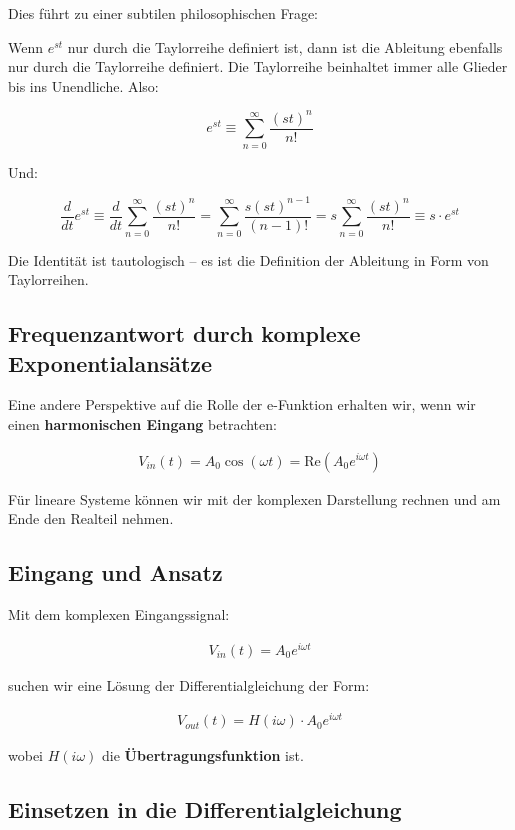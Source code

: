 \documentclass[a4paper, 12pt, twoside, openright]{report}
\theoremstyle{definition}
\theoremstyle{definition}
\begin{document}
Dies führt zu einer subtilen philosophischen Frage: 

Wenn $e^{st}$ nur durch die Taylorreihe definiert ist, dann ist die Ableitung ebenfalls nur durch die Taylorreihe definiert. Die Taylorreihe beinhaltet immer alle Glieder bis ins Unendliche. Also:

$$e^{st} \equiv \sum_{n=0}^{\infty} \frac{(st)^n}{n!}$$

Und:

$$\frac{d}{dt} e^{st} \equiv \frac{d}{dt} \sum_{n=0}^{\infty} \frac{(st)^n}{n!} = \sum_{n=0}^{\infty} \frac{s(st)^{n-1}}{(n-1)!} = s \sum_{n=0}^{\infty} \frac{(st)^n}{n!} \equiv s \cdot e^{st}$$

Die Identität ist tautologisch -- es ist die Definition der Ableitung in Form von Taylorreihen.


\subsection{Frequenzantwort durch komplexe Exponentialansätze}

Eine andere Perspektive auf die Rolle der e-Funktion erhalten wir, wenn wir einen \textbf{harmonischen Eingang} betrachten:

\begin{align}
	V_{in}(t) = A_0 \cos(\omega t) = \text{Re}(A_0 e^{i\omega t})
\end{align}

Für lineare Systeme können wir mit der komplexen Darstellung rechnen und am Ende den Realteil nehmen.

\subsection{Eingang und Ansatz}

Mit dem komplexen Eingangssignal:

\begin{align}
	V_{in}(t) = A_0 e^{i\omega t}
\end{align}

suchen wir eine Lösung der Differentialgleichung der Form:

\begin{align}
	V_{out}(t) = H(i\omega) \cdot A_0 e^{i\omega t}
\end{align}

wobei $H(i\omega)$ die \textbf{Übertragungsfunktion} ist.

\subsection{Einsetzen in die Differentialgleichung}
\end{document}
